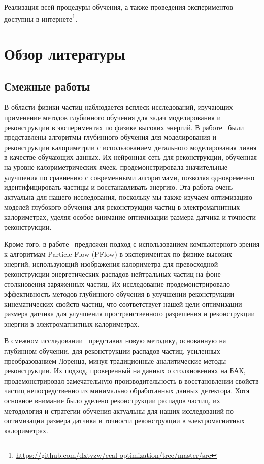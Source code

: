 \documentclass[a4paper,12pt]{extarticle}
\begin{document}
Реализация всей процедуры обучения, а также проведения экспериментов доступны в интернете\footnote{\url{https://github.com/dxtvzw/ecal-optimization/tree/master/src}}.

\section{Обзор литературы}
\label{section:related_work}

\subsection{Смежные работы}
\label{subsection:related_work}

В области физики частиц наблюдается всплеск исследований, изучающих применение методов глубинного обучения для задач моделирования и реконструкции в экспериментах по физике высоких энергий. В работе~\cite{Belayneh_2020} были представлены алгоритмы глубинного обучения для моделирования и реконструкции калориметрии с использованием детального моделирования ливня в качестве обучающих данных. Их нейронная сеть для реконструкции, обученная на уровне калориметрических ячеек, продемонстрировала значительные улучшения по сравнению с современными алгоритмами, позволяя одновременно идентифицировать частицы и восстанавливать энергию. Эта работа очень актуальна для нашего исследования, поскольку мы также изучаем оптимизацию моделей глубокого обучения для реконструкции частиц в электромагнитных калориметрах, уделяя особое внимание оптимизации размера датчика и точности реконструкции.

Кроме того, в работе~\cite{Di_Bello_2021} предложен подход с использованием компьютерного зрения к алгоритмам Particle Flow (PFlow) в экспериментах по физике высоких энергий, использующий изображения калориметра для превосходной реконструкции энергетических распадов нейтральных частиц на фоне столкновения заряженных частиц. Их исследование продемонстрировало эффективность методов глубинного обучения в улучшении реконструкции кинематических свойств частиц, что соответствует нашей цели оптимизации размера датчика для улучшения пространственного разрешения и реконструкции энергии в электромагнитных калориметрах.

В смежном исследовании~\cite{PhysRevD.108.052002} представил новую методику, основанную на глубинном обучении, для реконструкции распадов частиц, усиленных преобразованием Лоренца, минуя традиционные аналитические методы реконструкции. Их подход, проверенный на данных о столкновениях на БАК, продемонстрировал замечательную производительность в восстановлении свойств частиц непосредственно из минимально обработанных данных детектора. Хотя основное внимание было уделено реконструкции распадов частиц, их методология и стратегии обучения актуальны для наших исследований по оптимизации размера датчика и точности реконструкции в электромагнитных калориметрах.
\end{document}

